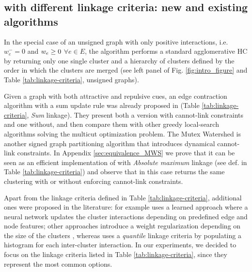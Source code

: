 \subsection{\algname{} with different linkage criteria: new and existing algorithms} \label{sec:alg_update_rules}

In the special case of an unsigned graph with only positive interactions, i.e. $w_e^-=0$ and $w_e \geq 0$ $\forall e\in E$, %
 the algorithm performs a standard agglomerative HC by returning only one single cluster and a hierarchy of clusters defined by the order in which the clusters are merged (see left panel of Fig. \hyperref[fig:intro_figure]{\ref*{fig:intro_figure}} and Table \ref{tab:linkage-criteria}, unsigned graphs).

Given a graph with both attractive and repulsive cues, an edge contraction algorithm with a sum update rule was already proposed in \cite{levinkov2017comparative,keuper2015efficient} (Table \ref{tab:linkage-criteria}, \emph{Sum} linkage). They present both a version with cannot-link constraints and one without, and then compare them with other greedy local-search algorithms solving the multicut optimization problem.
The Mutex Watershed \cite{wolf2018mutex} is another signed graph partitioning algorithm that introduces dynamical cannot-link constraints. In Appendix \ref{sec:equivalence_MWS} we prove that it can be seen as an efficient implementation of \algname{} with \emph{Absolute maximum} linkage (see def. in Table \ref{tab:linkage-criteria}) and observe that in this case \algname{} returns the same clustering with or without enforcing cannot-link constraints.

Apart from the linkage criteria defined in Table \ref{tab:linkage-criteria}, additional ones were proposed in the literature:
\cite{nunez2013machine} for example uses a learned approach where a neural network updates the cluster interactions depending on predefined edge and node features; other approaches introduce a weight regularization depending on the size of the clusters \cite{felzenszwalb2004efficient,kardoostsolving}, whereas 
\cite{funke2018large} uses a \emph{quantile} linkage criteria by populating a histogram for each inter-cluster interaction. In our experiments, we decided to focus on the linkage criteria listed in Table \ref{tab:linkage-criteria}, since they represent the most common options.

